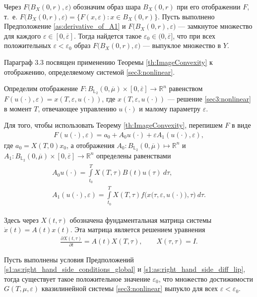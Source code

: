 \documentclass[../abstract.tex]{subfiles}
\begin{document}
\begin{theorem}\label{th:ImageConvexity}
	Через $F\big(B_X(0,r),\varepsilon\big)$ обозначим образ шара $B_X(0, r)$ при его отображении $F$, т.~е. $F\big(B_X(0,r),\varepsilon\big) = \big\{F(x,\varepsilon): x\in B_X(0, r)\big\}$.
	Пусть выполнено Предположение \ref{as:derivative_of_A1} и $F\big(B_X(0,r),\varepsilon\big)$ --- замкнутое множество для каждого $\varepsilon \in [0, \overline{\varepsilon}]$. 
	Тогда найдется такое $ \varepsilon_0 \in (0, \overline{\varepsilon}]$, что при всех положительных $\varepsilon < \varepsilon_0$ образ $F\big(B_X(0,r),\varepsilon\big)$ --- выпуклое множество в $Y$. 
\end{theorem}

Параграф 3.3 посвящен применению Теоремы \ref{th:ImageConvexity} к отображению, определяемому системой \eqref{sec3:nonlinear}.

Определим отображение $F:B_{\mathbb{L}_2}(0,\overline{\mu})\times [0,\overline{\varepsilon}] \to \mathbb{R}^n$ равенством $F(u(\cdot),\varepsilon) = x(T,\varepsilon,u(\cdot))$, где $x(T,\varepsilon,u(\cdot))$ --- решение \eqref{sec3:nonlinear} в момент $T$, отвечающее управлению $u(\cdot)$ и малому параметру $\varepsilon$.

Для того, чтобы использовать Теорему \ref{th:ImageConvexity}, перепишем $F$ в виде
\begin{gather*}
	F(u(\cdot),\varepsilon) = a_0 + A_0 u(\cdot) + \varepsilon A_1(u(\cdot), \varepsilon), 
\end{gather*}
где $a_0 = X(T,0)x_0 $, а отображения $A_0: B_{\mathbb{L}_2}(0,\overline{\mu}) \mapsto \mathbb{R}^n$ и $A_1: B_{\mathbb{L}_2}(0,\overline{\mu}) \times [0,\overline{\varepsilon}] \to \mathbb{R}^n$ определены равенствами
\begin{gather}\label{A1_def}
	\begin{gathered}
	A_0 u(\cdot) = \int\limits_{t_0}^T X(T,\tau) B(t)u(\tau)\ d\tau, \\
	A_1(u(\cdot),\varepsilon) = \int\limits_{t_0}^T X(T,\tau) f\Big(x\big(\tau,\varepsilon, u(\cdot)\big),\tau\Big) \ d\tau.
	\end{gathered}
\end{gather}

Здесь через  $X(t,\tau)$ обозначена фундаментальная матрица системы $\dot{x}(t) = A(t) x(t)$.
Эта матрица является решением уравнения
\begin{gather*}
	\frac{\partial X(t,\tau)}{\partial t} = A(t) X(T,\tau), \qquad X(\tau,\tau) = I.
\end{gather*}




\begin{theorem}\label{th:ReachableSetsConvexity}
	Пусть выполнены условия Предположений \ref{s1:as:right_hand_side_conditions_global} и \ref{s1:as:right_hand_side_diff_lip}, тогда существует такое положительное значение $\varepsilon_0$, что множество достижимости $G(T,\mu,\varepsilon) $ квазилинейной системы \eqref{sec3:nonlinear} выпукло для всех $\varepsilon < \varepsilon_0$. 
\end{theorem}
\end{document}
